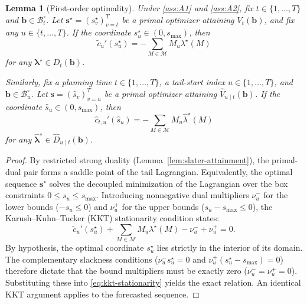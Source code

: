 \documentclass{uai2026} %
\newtheorem{lemma}{Lemma}
\newcommand{\1}{\mathbf{1}}
\newcommand{\mcal}{\mathcal{M}}
\newcommand{\bcal}{\mathcal{B}}
\begin{document}
\begin{lemma}[First-order optimality]
  \label{lem:interior-optimality}
  Under \ref{ass:A1} and \ref{ass:A2}, fix $t \in \{1,\dots,T\}$ and $\mathbf{b} \in \bcal_t^\circ$.
  Let $\mathbf{s}^\star = (s_v^\star)_{v=t}^{T}$ be a primal optimizer attaining $V_t(\mathbf{b})$, and fix any $u \in \{t,\dots,T\}$.
  If the coordinate $s_u^\star \in (0, s_{\max})$, then
  \begin{equation*}
    \tilde{c}_u'(s_u^\star) = - \sum_{M \in \mcal} M_{u} \lambda^\star(M)
  \end{equation*}
  for any $\boldsymbol{\lambda}^\star \in D_t(\mathbf{b})$.

  Similarly, fix a planning time $t \in \{1,\dots,T\}$, a tail-start index $u \in \{1,\dots,T\}$, and $\mathbf{b} \in \bcal_u^\circ$.
  Let $\hat{\mathbf{s}} = (\hat{s}_v)_{v=u}^{T}$ be a primal optimizer attaining $\hat{V}_{u \mid t}(\mathbf{b})$.
  If the coordinate $\hat{s}_u \in (0, s_{\max})$, then
  \begin{equation*}
    \hat{c}_{t,u}'(\hat{s}_u) = - \sum_{M \in \mcal} M_{u} \hat{\lambda}^\star(M)
  \end{equation*}
  for any $\hat{\boldsymbol{\lambda}}^\star \in \hat{D}_{u \mid t}(\mathbf{b})$.
\end{lemma}
\begin{proof}
  By restricted strong duality (Lemma~\ref{lem:slater-attainment}), the primal-dual pair forms a saddle point of the tail Lagrangian.
  Equivalently, the optimal sequence $\mathbf{s}^\star$ solves the decoupled minimization of the Lagrangian over the box constraints $0 \le s_u \le s_{\max}$.
  Introducing nonnegative dual multipliers $\nu_u^-$ for the lower bounds ($-s_u \le 0$) and $\nu_u^+$ for the upper bounds ($s_u - s_{\max} \le 0$), the Karush--Kuhn--Tucker (KKT) stationarity condition states:
  \begin{equation}
    \label{eq:kkt-stationarity}
    \tilde{c}_u'(s_u^\star) + \sum_{M \in \mcal} M_{u} \lambda^\star(M) - \nu_u^- + \nu_u^+ = 0.
  \end{equation}
  By hypothesis, the optimal coordinate $s_u^\star$ lies strictly in the interior of its domain. The complementary slackness conditions ($\nu_u^- s_u^\star = 0$ and $\nu_u^+(s_u^\star - s_{\max}) = 0$) therefore dictate that the bound multipliers must be exactly zero ($\nu_u^- = \nu_u^+ = 0$). Substituting these into \eqref{eq:kkt-stationarity} yields the exact relation. An identical KKT argument applies to the forecasted sequence.
\end{proof}
\end{document}
